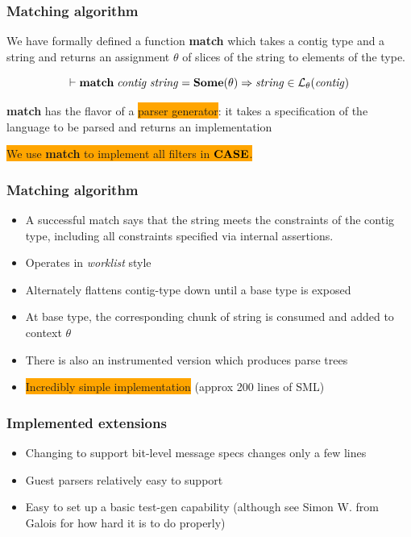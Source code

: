 \documentclass{beamer}
\newcommand{\imp}{\Rightarrow}
\newcommand{\kemph}[1]{\colorbox{orange}{#1}}
\newcommand{\konst}[1]{\ensuremath{\mbox{\bf{#1}}}}
\newcommand{\LangTheta}[1]{\ensuremath{{\mathcal L}_{\theta}({#1})}}
\begin{document}
\begin{frame}\frametitle{Matching algorithm}

We have formally defined a function \textbf{match} which takes a
contig type and a string and returns an assignment $\theta$ of slices
of the string to elements of the type.

\begin{theorem}[Soundness]
  \[
 \vdash \konst{match}\; \mathit{contig}\; \mathit{string} = \konst{Some}(\theta) \imp
   \mathit{string} \in \LangTheta{\mathit{contig}}
\]
\end{theorem}

\textbf{match} has the flavor of a \kemph{parser generator}: it takes a
specification of the language to be parsed and returns an implementation

\kemph{We use \textbf{match} to implement all filters in \konst{CASE}.}

\end{frame}


\begin{frame}\frametitle{Matching algorithm}

\begin{itemize}

\item A successful match says that the string meets the constraints of
  the contig type, including all constraints specified via internal
  assertions.


\item Operates in \emph{worklist} style

\item Alternately flattens contig-type down until a base type is exposed

\item At base type, the corresponding chunk of string is consumed and added to context $\theta$

\item There is also an instrumented version which produces parse trees

\item \kemph{Incredibly simple implementation} (approx 200 lines of SML)
\end{itemize}

\end{frame}


\begin{frame}\frametitle{Implemented extensions}

\begin{itemize}

\item Changing to support bit-level message specs changes only a few lines

\item Guest parsers relatively easy to support

\item Easy to set up a basic test-gen capability (although see Simon
  W. from Galois for how hard it is to do properly)

\end{itemize}

\end{frame}
\end{document}
